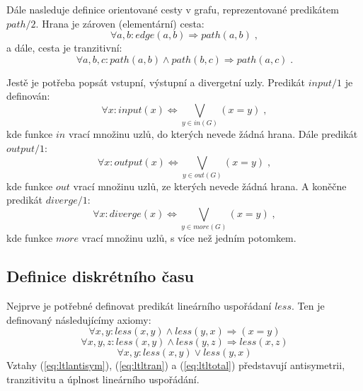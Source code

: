 \documentclass[a4paper,journal]{IEEEtran}
\begin{document}
Dále nasleduje definice orientované cesty v grafu, reprezentované predikátem $path/2$. Hrana je zároven (elementární) cesta:
\begin{equation}
\forall a,b: edge(a,b) \Rightarrow path(a,b)\;,
\end{equation}
a dále, cesta je tranzitivní:
\begin{equation}
	\forall a,b,c: path(a,b)\wedge path(b,c) \Rightarrow path(a,c)\;.
\end{equation}


Jestě je potřeba popsát vstupní, výstupní a divergetní uzly.
Predikát $input/1$ je definován:
\begin{equation}
\forall x: input(x) \Leftrightarrow \bigvee_{y \in in(G)} (x=y)\;,
\end{equation}
kde funkce $in$ vrací množinu uzlů, do kterých nevede žádná hrana. Dále predikát $output/1$:
\begin{equation}
\forall x: output(x) \Leftrightarrow \bigvee_{y \in out(G)} (x=y)\;,
\end{equation}
kde funkce $out$ vrací množinu uzlů, ze kterých nevede žádná hrana. A koněčne predikát $diverge/1$:
\begin{equation}
\forall x: diverge(x) \Leftrightarrow \bigvee_{y \in more(G)} (x=y)\;,
\end{equation}
kde funkce $more$ vrací množinu uzlů, s více než jedním potomkem.


\subsection{Definice diskrétního času}
Nejprve je potřebné definovat predikát lineárního uspořádaní $less$. 
Ten je definovaný následujícímy axiomy:
\begin{equation}\label{eq:ltlantisym}
\forall x,y:  less(x,y) \wedge less(y,x)\Rightarrow (x = y)
\end{equation}
\begin{equation}\label{eq:ltltran}
\forall x,y,z: less(x,y) \wedge less(y,z) \Rightarrow less(x,z) 
\end{equation}
\begin{equation}\label{eq:ltltotal}
\forall x,y: less(x,y) \vee less(y,x)
\end{equation}
Vztahy (\ref{eq:ltlantisym}), (\ref{eq:ltltran}) a (\ref{eq:ltltotal}) představují antisymetrii,
tranzitivitu a úplnost lineárního uspořádání.
\end{document}
